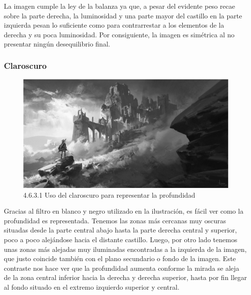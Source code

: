 \documentclass[12pt]{article}
\begin{document}
    La imagen cumple la ley de la balanza ya que, a pesar del evidente peso recae sobre la parte derecha, la luminosidad y una parte mayor del castillo en la parte izquierda pesan lo suficiente como para contrarrestar a los elementos de la derecha y su poca luminosidad. Por consiguiente, la imagen es simétrica al no presentar ningún desequilibrio final.


        \subsubsection{Claroscuro}

        
    \begin{figure}[H]
      \centering
      \includegraphics[scale=0.4]{images/Nerea/Nerea Zelda concept 631.PNG}
      \caption{\small 4.6.3.1 Uso del claroscuro para representar la profundidad}
    \end{figure}

    Gracias al filtro en blanco y negro utilizado en la ilustración, es fácil ver como la profundidad es representada. Tenemos las zonas más cercanas muy oscuras situadas desde la parte central abajo hasta la parte derecha central y superior, poco a poco alejándose hacia el distante castillo. Luego, por otro lado tenemos unas zonas más alejadas muy iluminadas encontradas a la izquierda de la imagen, que justo coincide también con el plano secundario o fondo de la imagen. Este contraste nos hace ver que la profundidad aumenta conforme la mirada se aleja de la zona central inferior hacia la derecha y derecha superior, hasta por fin llegar al fondo situado en el extremo izquierdo superior y central.
\end{document}

